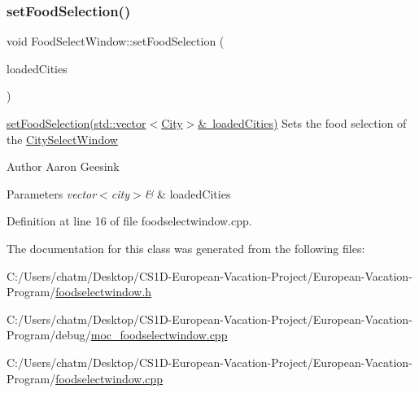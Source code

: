 \subsubsection{\texorpdfstring{setFoodSelection()}{setFoodSelection()}}
{\footnotesize\ttfamily void Food\+Select\+Window\+::set\+Food\+Selection (\begin{DoxyParamCaption}\item[{std\+::vector$<$ \mbox{\hyperlink{class_city}{City}} $>$ \&}]{loaded\+Cities }\end{DoxyParamCaption})}



\mbox{\hyperlink{class_food_select_window_a6df884d5b39d16a2708f8bcae205ecd5}{set\+Food\+Selection(std\+::vector$<$\+City$>$\& loaded\+Cities)}} Sets the food selection of the \mbox{\hyperlink{class_city_select_window}{City\+Select\+Window}} 

\begin{DoxyAuthor}{Author}
Aaron Geesink 
\end{DoxyAuthor}

\begin{DoxyParams}{Parameters}
{\em vector$<$city$>$\&} & loaded\+Cities \\
\hline
\end{DoxyParams}


Definition at line 16 of file foodselectwindow.\+cpp.



The documentation for this class was generated from the following files\+:\begin{DoxyCompactItemize}
\item 
C\+:/\+Users/chatm/\+Desktop/\+C\+S1\+D-\/\+European-\/\+Vacation-\/\+Project/\+European-\/\+Vacation-\/\+Program/\mbox{\hyperlink{foodselectwindow_8h}{foodselectwindow.\+h}}\item 
C\+:/\+Users/chatm/\+Desktop/\+C\+S1\+D-\/\+European-\/\+Vacation-\/\+Project/\+European-\/\+Vacation-\/\+Program/debug/\mbox{\hyperlink{moc__foodselectwindow_8cpp}{moc\+\_\+foodselectwindow.\+cpp}}\item 
C\+:/\+Users/chatm/\+Desktop/\+C\+S1\+D-\/\+European-\/\+Vacation-\/\+Project/\+European-\/\+Vacation-\/\+Program/\mbox{\hyperlink{foodselectwindow_8cpp}{foodselectwindow.\+cpp}}\end{DoxyCompactItemize}
